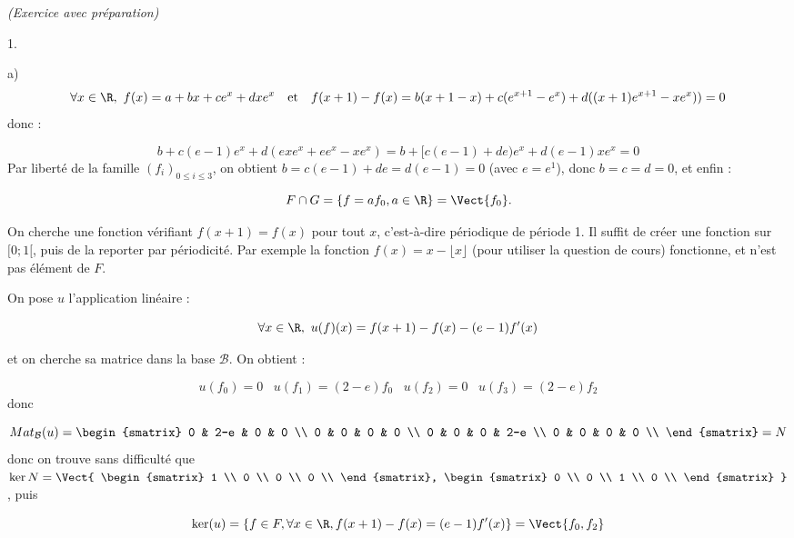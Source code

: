 \documentclass[11pt]{article}%
\begin{document}
\begin{exercice}{\it (Exercice avec préparation)}
\begin{noliste}{1.}
\begin{noliste}{a)}
\[
 \forall x \in \R, \ f(x) = a + b x + c e^{x} + d x e^{x} \ \
 \text{ et } \ \ f(x + 1) - f(x) = b (x + 1-x) + c ( e^{x + 1} - e^{x}
)
 + d ( (x + 1) e^{x + 1} - x e^{x} ) ) = 0
\]
 donc : 
 
\[
 b + c (e-1) e^{x} + d ( e x e^{x} + e e^{x} - x e^{x} ) = b + [ c
(e-1)
 + d e ) e^{x} + d (e - 1 ) x e^{x} = 0
\]
 Par liberté de la famille $(f_{i})_{ 0 \leq i \leq 3} $, on
 obtient $b = c ( e-1) + d e = d ( e-1) = 0 $ (avec $e = e^{1}$),
 donc $b = c = d = 0$, et enfin :
 
\[
 F \cap G = \{ f = a f_{0}, a \in \R \} = \Vect{ f_{0} }. 
\]
 
 \item On cherche une fonction vérifiant $f ( x + 1 ) = f(x)$ pour
 tout $x$, c'est-à-dire périodique de période 1. Il suffit de
 créer une fonction sur $[0;1[$, puis de la reporter par
 périodicité. Par exemple la fonction $f(x) = x - \lfloor x
 \rfloor$ (pour utiliser la question de cours) fonctionne, et
 n'est pas élément de $F$. 
 \end{noliste}

 \item On pose $u$ l'application linéaire :
 
\[
 \forall x \in \R, \ u (f) (x) = f(x + 1) - f(x) - (e-1) f'(x) 
\]
 
 et on cherche sa matrice dans la base $\mathcal{B}$. On obtient :
 
\[
 u (f_{0}) = 0 \ \, \ \ u (f_{1} ) = (2-e) f_{0} \ \, \ \ u (f_{2}) = 0
 \ \, \ \ u (f_{3} ) = (2-e) f_{2}
\]
 donc
 
\[
 Mat_{ \mathcal{B} } (u) = \begin{smatrix}
0 & 2-e & 0 & 0 \\
0 & 
 0 & 0 & 0 \\
0 & 0 & 0 & 2-e \\
0 & 0 & 0 & 0 \\
\end{smatrix}
 = 
 N
\]
 donc on trouve sans difficulté que $\ker N = \Vect
 { \begin{smatrix}
1 \\
0 \\
0 \\
0 \\
\end{smatrix}, \begin{smatrix}
0 \\
0 \\
1 \\
0 \\
\end{smatrix}
}$, puis
 
\[
 \ker ( u ) = \{ f \in F, \forall x \in \R, f(x + 1) - f(x) = 
 (e-1) f'(x) \} = \Vect{ f_{0}, f_{2} }
\]
 \end{noliste}
\end{exercice}
\end{document}
